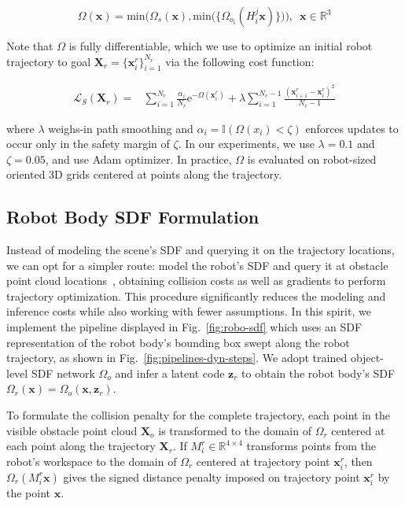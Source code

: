 \documentclass[letterpaper, 10 pt, conference]{ieeeconf}  %
\begin{document}
\vspace{-3mm}
\begin{equation}
    \Omega(\mathbf{x}) = \mathrm{min}\Big( \Omega_s(\mathbf{x}), \mathrm{min}\big(\{\Omega_{o_i}(H_i^j \mathbf{x})\} \big) \Big), \,\,\, \mathbf{x} \in \mathbb{R}^3
\end{equation}

\noindent Note that $\Omega$ is fully differentiable, which we use to optimize an initial robot trajectory to goal $\mathbf{X}_r = \{ \mathbf{x}_i^r \}_{i=1}^{N_r}$ via the following cost function:

\vspace{-3mm}
\begin{align}
    \mathcal{L}_S(\mathbf{X}_r) = & \sum_{i=1}^{N_r}{ \frac{\alpha_i}{N_r} \mathrm{e}^{- \Omega(\mathbf{x}_i^r) } } + \lambda \sum_{i=1}^{N_r-1} \frac{(\mathbf{x}^r_{i+1} - \mathbf{x}^r_{i})^2}{N_r-1}
\end{align}

\noindent where $\lambda$ weighs-in path smoothing and $\alpha_i = \mathbb{I}(\Omega(x_i) < \zeta)$ enforces updates to occur only in the safety margin of $\zeta$.
In our experiments, we use $\lambda=0.1$ and $\zeta=0.05$, and use Adam optimizer.
In practice, $\Omega$ is evaluated on robot-sized oriented 3D grids centered at points along the trajectory.

\subsection{\label{ssec:robo-sdf}Robot Body SDF Formulation}

Instead of modeling the scene's SDF and querying it on the trajectory locations, we can opt for a simpler route:
model the robot's SDF and query it at obstacle point cloud locations~\cite{anyshapetrajopt23}, obtaining collision costs as well as gradients to perform trajectory optimization.
This procedure significantly reduces the modeling and inference costs while also working with fewer assumptions.
In this spirit, we implement the pipeline displayed in Fig.~\ref{fig:robo-sdf} which uses an SDF representation of the robot body's bounding box swept along the robot trajectory, as shown in Fig.~\ref{fig:pipelines-dyn-steps}.
We adopt trained object-level SDF network $\Omega_o$ and infer a latent code $\mathbf{z}_r$ to obtain the robot body's SDF $\Omega_r(\mathbf{x}) = \Omega_o(\mathbf{x}, \mathbf{z}_r)$.

To formulate the collision penalty for the complete trajectory, each point in the visible obstacle point cloud $\mathbf{X}_o$ is transformed to the domain of $\Omega_r$ centered at each point along the trajectory $\mathbf{X}_r$.
If $M_i^r \in \mathbb{R}^{4\times4}$ transforms points from the robot's workspace to the domain of $\Omega_r$ centered at trajectory point $\mathbf{x}_i^r$, then $\Omega_r(M_i^r \mathbf{x})$ gives the signed distance penalty imposed on trajectory point $\mathbf{x}_i^r$ by the point $\mathbf{x}$.
\end{document}
